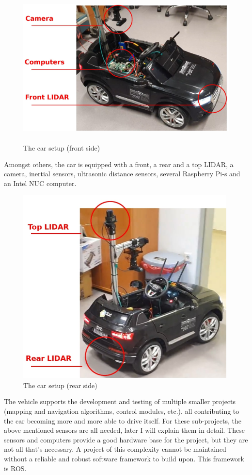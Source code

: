 \begin{figure}[!ht]
    \centering
    \includegraphics[height=80mm]{figures/raw/jpeg/car_setup_front.jpg}
    \caption{The car setup (front side)}
    \label{car_setup_front}
\end{figure}

Amongst others, the car is equipped with a front, a rear and a top LIDAR, a camera, inertial sensors, ultrasonic distance sensors, several Raspberry Pi-s and an Intel NUC computer.

\begin{figure}[!ht]
    \centering
    \includegraphics[height=100mm]{figures/raw/jpeg/car_setup_rear.jpg}
    \caption{The car setup (rear side)}
    \label{car_setup_rear}
\end{figure}

The vehicle supports the development and testing of multiple smaller projects (mapping and navigation algorithms, control modules, etc.), all contributing to the car becoming more and more able to drive itself. For these sub-projects, the above mentioned sensors are all needed, later I will explain them in detail. These sensors and computers provide a good hardware base for the project, but they are not all that's necessary. A project of this complexity cannot be maintained without a reliable and robust software framework to build upon. This framework is ROS.


